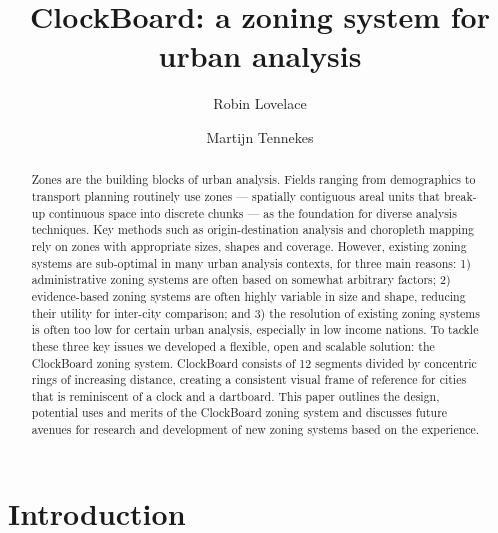 \documentclass{josis}
\begin{document}


\title{ClockBoard: a zoning system for urban analysis}

\author{Robin Lovelace}
\author{Martijn Tennekes}

\maketitle


\begin{abstract}
Zones are the building blocks of urban analysis.
Fields ranging from demographics to transport planning routinely use zones --- spatially contiguous areal units that break-up continuous space into discrete chunks --- as the foundation for diverse analysis techniques.
Key methods such as origin-destination analysis and choropleth mapping rely on zones with appropriate sizes, shapes and coverage.
However, existing zoning systems are sub-optimal in many urban analysis contexts, for three main reasons:
1) administrative zoning systems are often based on somewhat arbitrary factors;
2) evidence-based zoning systems are often highly variable in size and shape, reducing their utility for inter-city comparison; and
3) the resolution of existing zoning systems is often too low for certain urban analysis, especially in low income nations.
To tackle these three key issues we developed a flexible, open and scalable solution: the ClockBoard zoning system.
ClockBoard consists of 12 segments divided by concentric rings of increasing distance, creating a consistent visual frame of reference for cities that is reminiscent of a clock and a dartboard.
This paper outlines the design, potential uses and merits of the ClockBoard zoning system and discusses future avenues for research and development of new zoning systems based on the experience.
\end{abstract}

\section{Introduction}
\end{document}
